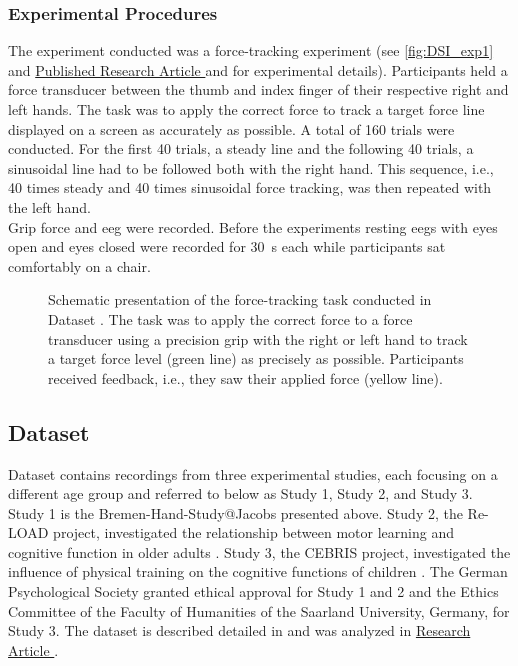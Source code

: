 \subsubsection{Experimental Procedures}
\label{methods:datasets:I:experiment}
The experiment conducted was a force-tracking experiment (see \autoref{fig:DSI_exp1} and \hyperref[pub:paperI]{Published Research Article } and \hyperref[pub:paperI]{} for experimental details). Participants held a force transducer between the thumb and index finger of their respective right and left hands. The task was to apply the correct force to track a target force line displayed on a screen as accurately as possible. A total of 160 trials were conducted. For the first 40 trials, a steady line and the following 40 trials, a sinusoidal line had to be followed both with the right hand. This sequence, i.e., 40 times steady and 40 times sinusoidal force tracking, was then repeated with the left hand.\\
Grip force and \gls{eeg} were recorded. Before the experiments resting \glspl{eeg} with eyes open and eyes closed were recorded for 30~s each while participants sat comfortably on a chair.

\begin{figure}[ht]
\begin{center}

\caption[Schematic presentation of the force-tracking task conducted in Dataset .]{Schematic presentation of the force-tracking task conducted in Dataset . The task was to apply the correct force to a force transducer using a precision grip with the right or left hand to track a target force level (green line) as precisely as possible. Participants received feedback, i.e., they saw their applied force (yellow line).}
\label{fig:DSI_exp1}
\end{center}
\end{figure}

\newpage
\subsection{Dataset }
\label{methods:datasets:II}
Dataset  contains recordings from three experimental studies, each focusing on a different age group and referred to below as Study 1, Study 2, and Study 3.\\
Study 1 is the Bremen-Hand-Study@Jacobs presented above. Study 2, the Re-LOAD project, investigated the relationship between motor learning and cognitive function in older adults \cite{Hübner2018a, Hübner2018b}. Study 3, the CEBRIS project, investigated the influence of physical training on the cognitive functions of children \cite{Koutsandreou2016}. The German Psychological Society granted ethical approval for Study 1 and 2 and the Ethics Committee of the Faculty of Humanities of the Saarland University, Germany, for Study 3. The dataset is described detailed in \cite{Reuter2019} and was analyzed in \hyperref[results:paperII]{Research Article }.

